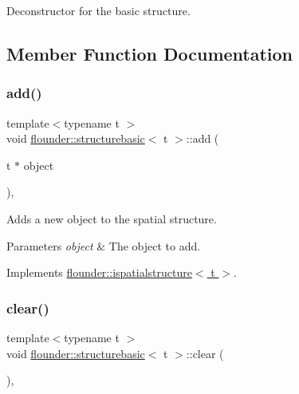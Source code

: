 Deconstructor for the basic structure. 



\subsection{Member Function Documentation}
\mbox{\label{classflounder_1_1structurebasic_a4e3549d986f547a8789d38cf8a820f18}} 
\subsubsection{\texorpdfstring{add()}{add()}}
{\footnotesize\ttfamily template$<$typename t $>$ \\
void \hyperlink{classflounder_1_1structurebasic}{flounder\+::structurebasic}$<$ t $>$\+::add (\begin{DoxyParamCaption}\item[{t $\ast$}]{object }\end{DoxyParamCaption})\hspace{0.3cm}{\ttfamily [override]}, {\ttfamily [virtual]}}



Adds a new object to the spatial structure. 


\begin{DoxyParams}{Parameters}
{\em object} & The object to add. \\
\hline
\end{DoxyParams}


Implements \hyperlink{classflounder_1_1ispatialstructure_aaab8169c14104918fa96cca1a6d6700f}{flounder\+::ispatialstructure$<$ t $>$}.

\mbox{\label{classflounder_1_1structurebasic_a080579359485a5b32489a004c70da095}} 
\subsubsection{\texorpdfstring{clear()}{clear()}}
{\footnotesize\ttfamily template$<$typename t $>$ \\
void \hyperlink{classflounder_1_1structurebasic}{flounder\+::structurebasic}$<$ t $>$\+::clear (\begin{DoxyParamCaption}{ }\end{DoxyParamCaption})\hspace{0.3cm}{\ttfamily [override]}, {\ttfamily [virtual]}}



